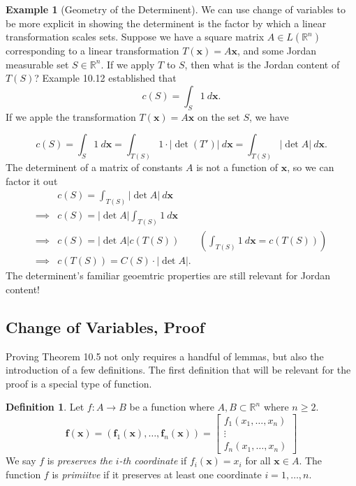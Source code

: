 \documentclass{article}
\newcommand{\R}{\mathbb{R}}
\newcommand{\x}{\mathbf{x}}
\newcommand{\f}{\mathbf{f}}
\newcommand{\abs}[1]{\left\lvert#1\right\rvert}
\theoremstyle{definition}
\newtheorem{definition}{Definition}[section]
\newtheorem{example}{Example}[section]
\begin{document}
\begin{example}[Geometry of the Determinent]
	We can use change of variables to be more explicit in showing the determinent is the factor by which a linear transformation scales sets. Suppose we have a square matrix $A \in L(\R^n)$ corresponding to a linear transformation $T(\x)= A\x$, and some Jordan measurable set $S \in \R^n$. If we apply $T$ to $S$, then what is the Jordan content of $T(S)$? Example 10.12 established that 
	$$ c(S) = \int_S 1\ d\x.$$ If we apple the transformation $T(\x) = A\x$ on the set $S$, we have  
	
	$$ c(S) = \int_S 1\ d\x = \int_{T(S)} 1\cdot\abs{ \det(T') }\ d\x = \int_{T(S)}\abs{ \det A }\ d\x. $$ The determinent of a matrix of constants $A$ is not a function of $\x$, so we can factor it out 
	\begin{align*}
		&c(S) = \int_{T(S) }\abs{\det A}\ d\x\\
		\implies & c(S) = \abs{\det A} \int_{T(S)}1\ d\x \\
		\implies & c(S) = \abs{\det A} c(T(S)) & \left( \int_{T(S)}1\ d\x = c(T(S))\right)\\
		\implies & c(T(S)) = C(S)\cdot \abs{\det A}.
	\end{align*}
The determinent's familiar geoemtric properties are still relevant for Jordan content! 
\end{example}
	
	\subsection{Change of Variables, Proof}
	Proving Theorem 10.5 not only requires a handful of lemmas, but also the introduction of a few definitions. The first definition that will be relevant for the proof is a special type of function. 
	\begin{definition}\label{def}
		Let $f:A\to B$ be a function where $A,B\subset \R^n$ where $n\ge 2$.
		$$\f(\x) = (\f_1(\x), \ldots, \f_n(\x)) = \begin{bmatrix}
			f_1(x_1,\ldots,x_n)\\
			\vdots \\
						f_n(x_1,\ldots,x_n)
		\end{bmatrix} $$
		We say $f$ is \textit{\color{red}preserves the $i$-th coordinate } if $f_i(\x) = x_i$ for all $\x \in A$. The function $f$ is \textit{\color{red}primiitve} if it preserves at least one coordinate $i=1,\ldots,n$.

\end{definition}
\end{document}
